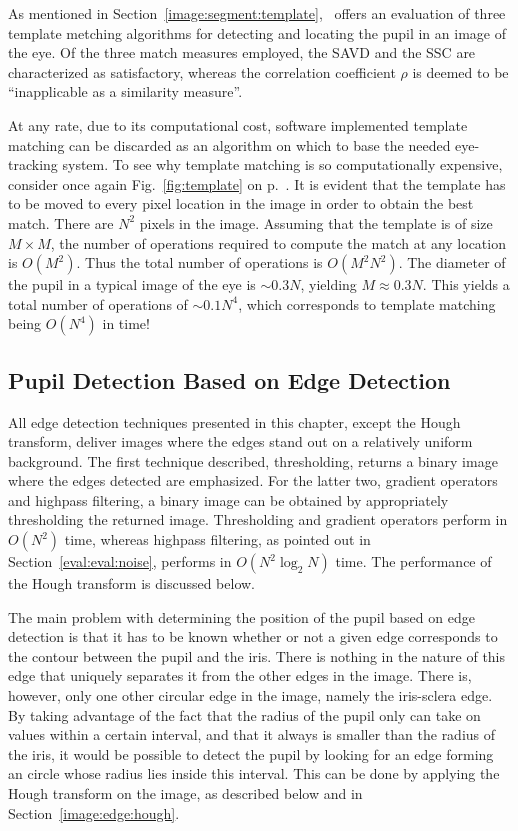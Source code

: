 As mentioned in Section~\ref{image:segment:template},~\cite{template}
offers an evaluation of three template metching algorithms for
detecting and locating the pupil in an image of the eye.  Of the three
match measures employed, the SAVD and the SSC are characterized as
satisfactory, whereas the correlation coefficient $\rho$ is deemed to
be ``inapplicable as a similarity measure''.

At any rate, due to its computational cost, software implemented
template matching can be discarded as an algorithm on which to base
the needed eye-tracking system.  To see why template matching is so
computationally expensive, consider once again Fig.~\ref{fig:template}
on p.~\pageref{fig:template}.  It is evident that the template has to
be moved to every pixel location in the image in order to obtain the
best match.  There are $N^{2}$ pixels in the image.  Assuming that the
template is of size $M\times M$, the number of operations required to
compute the match at any location is $O(M^{2})$.  Thus the total
number of operations is $O(M^{2}N^{2})$.  The diameter of the pupil in
a typical image of the eye is $\sim 0.3N$, yielding $M\approx 0.3N$.
This yields a total number of operations of $\sim 0.1N^{4}$, which
corresponds to template matching being $O(N^{4})$ in time!

\subsection{Pupil Detection Based on Edge Detection}
\label{eval:eval:edge}

All edge detection techniques presented in this chapter, except the
Hough transform, deliver images where the edges stand out on a
relatively uniform background.  The first technique described,
thresholding, returns a binary image where the edges detected are
emphasized.  For the latter two, gradient operators and highpass
filtering, a binary image can be obtained by appropriately
thresholding the returned image.  Thresholding and gradient operators
perform in $O(N^{2})$ time, whereas highpass filtering, as pointed out
in Section~\ref{eval:eval:noise}, performs in $O(N^{2}\log_{2}N)$
time.  The performance of the Hough transform is discussed below.

The main problem with determining the position of the pupil based on
edge detection is that it has to be known whether or not a given edge
corresponds to the contour between the pupil and the iris.  There is
nothing in the nature of this edge that uniquely separates it from the
other edges in the image.  There is, however, only one other circular
edge in the image, namely the iris-sclera edge.  By taking advantage
of the fact that the radius of the pupil only can take on values
within a certain interval, and that it always is smaller than the
radius of the iris, it would be possible to detect the pupil by
looking for an edge forming an circle whose radius lies inside this
interval.  This can be done by applying the Hough transform on the
image, as described below and in Section~\ref{image:edge:hough}.

